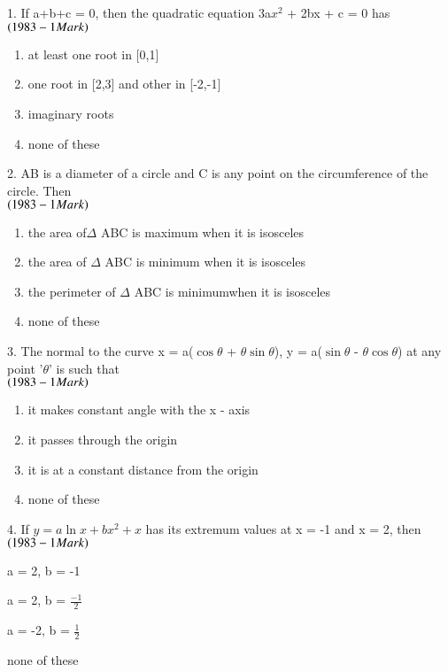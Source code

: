 \documentclass[journal,12pt,twocolumn]{IEEEtran}
\theoremstyle{remark}
\begin{document}
1.  If a+b+c = 0, then the quadratic equation 3a$x^2$ \indent + 2bx + c = 0 
has\hfill$\left(1983 - 1 Mark\right)$
\begin{enumerate}[label=\alph*.]
	\item at least one root in [0,1]
	\item one root in [2,3] and other in [-2,-1]
        \item imaginary roots
	\item none of these\\
\end{enumerate}
2.  AB is a diameter of a circle and C is any point \indent on the
circumference of the circle. Then\\ \indent\hfill
$\left(1983 - 1 Mark\right)$
\begin{enumerate}[label=\alph*.]
	\item the area of$\Delta$ ABC is maximum when it is isosceles
	\item the area of $\Delta$ ABC is minimum when it is isosceles
	\item the perimeter of $\Delta$ ABC is minimumwhen it is isosceles
	\item none of these\\
\end{enumerate}
3.  The normal to the curve x = a($\cos \theta$ + $\theta\sin \theta$),
\indent y = a($\sin \theta$ - $\theta\cos \theta$)
at any point '$\theta$' 
is such that\\\indent\hfill$\left(1983 - 1 Mark\right)$
\begin{enumerate}[label=\alph*.]
	\item it makes  constant angle with the x - axis
	\item it passes through the origin
	\item it is at a constant distance from the origin
	\item none of these\\
\end{enumerate}
4.  If $y=a\ln x + bx^2 +x$ has its extremum values at \indent x = -1
and x = 2, then\hfill$\left(1983 - 1 Mark\right)$
\begin{enumerate}[label=\alph*.]
\begin{multicols}{2}
	\item a = 2, b = -1
	\item a = 2, b = $\displaystyle\frac{-1}{2}$
	\item a = -2, b = $\displaystyle\frac{1}{2}$
	\item none of these
\end{multicols}
\end{enumerate}
\end{document}
